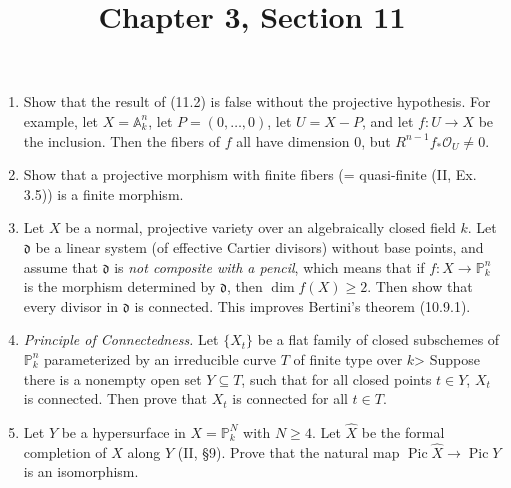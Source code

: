 \documentclass{article}
\title{Chapter 3, Section 11}
\newcommand{\goth}[1]{\mathfrak{#1}}
\newcommand{\fO}{\mathscr{O}}
\newcommand{\PP}{\mathbb{P}}
\newcommand{\A}{\mathbb{A}}
\DeclareMathOperator{\pic}{Pic}
\begin{document}
\maketitle
\begin{enumerate} [label=\textbf{\arabic*.}, leftmargin=0em]

\item Show that the result of (11.2) is false without the projective hypothesis. For example, let $X = \A_k^n$, let $P = (0, \dots, 0)$, let $U = X - P$, and let $f: U \to X$ be the inclusion. Then the fibers of $f$ all have dimension $0$, but $R^{n - 1} f_* \fO_U \neq 0$.

\item Show that a projective morphism with finite fibers (= quasi-finite (II, Ex. 3.5)) is a finite morphism.

\item Let $X$ be a normal, projective variety over an algebraically closed  field $k$. Let $\goth{d}$ be a linear system (of effective Cartier divisors) without base points, and assume that $\goth{d}$ is \textit{not composite with a pencil}, which means that if $f : X \to \PP_k^n$ is the morphism determined by $\goth{d}$, then $\dim{f(X)} \geq 2$. Then show that every divisor in $\goth{d}$ is connected. This improves Bertini's theorem (10.9.1).

\item \textit{Principle of Connectedness.} Let $\{ X_t \}$ be a flat family of closed subschemes of $\PP_k^n$ parameterized by an irreducible curve $T$ of finite type over $k$> Suppose there is a nonempty open set $Y \subseteq T$, such that for all closed points $t \in Y$, $X_t$ is connected. Then prove that $X_t$ is connected for all $t \in T$.

\item Let $Y$ be a hypersurface in $X = \PP_k^N$ with $N \geq 4$. Let $\hat{X}$ be the formal completion of $X$ along $Y$ (II, \S 9). Prove that the natural map $\pic{\hat{X}} \to \pic{Y}$ is an isomorphism.


\end{enumerate}
\end{document}
